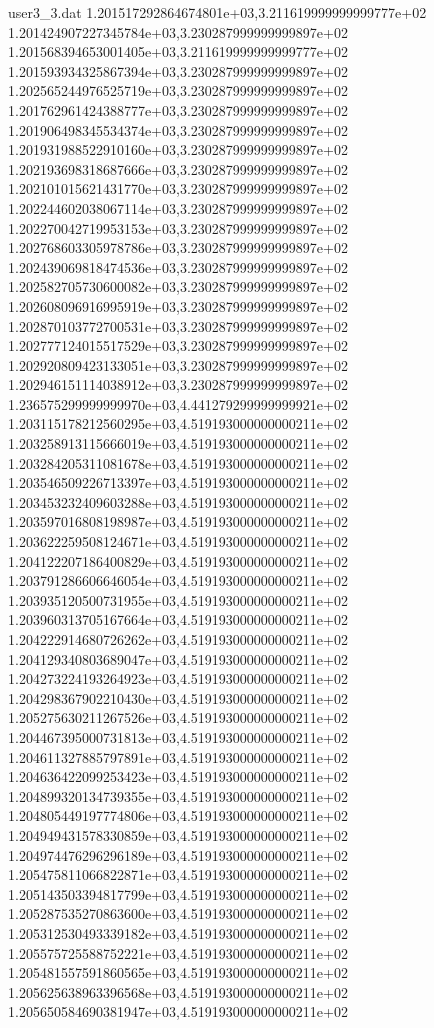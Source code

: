\begin{filecontents}{user3_3.dat}
1.201517292864674801e+03,3.211619999999999777e+02
1.201424907227345784e+03,3.230287999999999897e+02
1.201568394653001405e+03,3.211619999999999777e+02
1.201593934325867394e+03,3.230287999999999897e+02
1.202565244976525719e+03,3.230287999999999897e+02
1.201762961424388777e+03,3.230287999999999897e+02
1.201906498345534374e+03,3.230287999999999897e+02
1.201931988522910160e+03,3.230287999999999897e+02
1.202193698318687666e+03,3.230287999999999897e+02
1.202101015621431770e+03,3.230287999999999897e+02
1.202244602038067114e+03,3.230287999999999897e+02
1.202270042719953153e+03,3.230287999999999897e+02
1.202768603305978786e+03,3.230287999999999897e+02
1.202439069818474536e+03,3.230287999999999897e+02
1.202582705730600082e+03,3.230287999999999897e+02
1.202608096916995919e+03,3.230287999999999897e+02
1.202870103772700531e+03,3.230287999999999897e+02
1.202777124015517529e+03,3.230287999999999897e+02
1.202920809423133051e+03,3.230287999999999897e+02
1.202946151114038912e+03,3.230287999999999897e+02
1.236575299999999970e+03,4.441279299999999921e+02
1.203115178212560295e+03,4.519193000000000211e+02
1.203258913115666019e+03,4.519193000000000211e+02
1.203284205311081678e+03,4.519193000000000211e+02
1.203546509226713397e+03,4.519193000000000211e+02
1.203453232409603288e+03,4.519193000000000211e+02
1.203597016808198987e+03,4.519193000000000211e+02
1.203622259508124671e+03,4.519193000000000211e+02
1.204122207186400829e+03,4.519193000000000211e+02
1.203791286606646054e+03,4.519193000000000211e+02
1.203935120500731955e+03,4.519193000000000211e+02
1.203960313705167664e+03,4.519193000000000211e+02
1.204222914680726262e+03,4.519193000000000211e+02
1.204129340803689047e+03,4.519193000000000211e+02
1.204273224193264923e+03,4.519193000000000211e+02
1.204298367902210430e+03,4.519193000000000211e+02
1.205275630211267526e+03,4.519193000000000211e+02
1.204467395000731813e+03,4.519193000000000211e+02
1.204611327885797891e+03,4.519193000000000211e+02
1.204636422099253423e+03,4.519193000000000211e+02
1.204899320134739355e+03,4.519193000000000211e+02
1.204805449197774806e+03,4.519193000000000211e+02
1.204949431578330859e+03,4.519193000000000211e+02
1.204974476296296189e+03,4.519193000000000211e+02
1.205475811066822871e+03,4.519193000000000211e+02
1.205143503394817799e+03,4.519193000000000211e+02
1.205287535270863600e+03,4.519193000000000211e+02
1.205312530493339182e+03,4.519193000000000211e+02
1.205575725588752221e+03,4.519193000000000211e+02
1.205481557591860565e+03,4.519193000000000211e+02
1.205625638963396568e+03,4.519193000000000211e+02
1.205650584690381947e+03,4.519193000000000211e+02

\end{filecontents}
